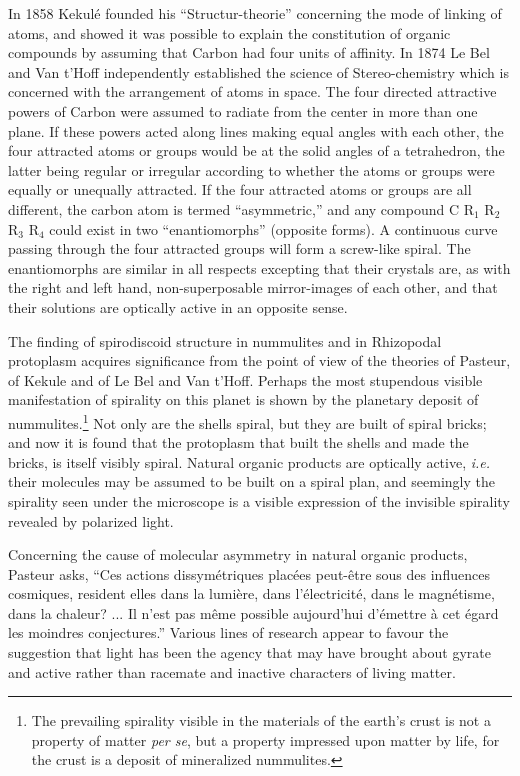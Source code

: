 \documentclass[a4paper, 12pt, oneside, landscape]{article}
\begin{document}
In 1858 Kekulé founded his ``Structur-theorie'' concerning the mode of linking of atoms, and showed it was possible to explain the constitution of organic compounds by assuming that Carbon had four units of affinity. In 1874 Le Bel and Van t'Hoff independently established the science of Stereo-chemistry which is concerned with the arrangement of atoms in space. The four directed attractive powers of Carbon were assumed to radiate from the center in more than one plane. If these powers acted along lines making equal angles with each other, the four attracted atoms or groups would be at the solid angles of a tetrahedron, the latter being regular or irregular according to whether the atoms or groups were equally or unequally attracted. If the four attracted atoms or groups are all different, the carbon atom is termed ``asymmetric,'' and any compound C R$_{1}$ R$_{2}$ R$_{3}$ R$_{4}$ could exist in two ``enantiomorphs'' (opposite forms). A continuous curve passing through the four attracted groups will form a screw-like spiral. The enantiomorphs are similar in all respects excepting that their crystals are, as with the right and left hand, non-superposable mirror-images of each other, and that their solutions are optically active in an opposite sense.

The finding of spirodiscoid structure in nummulites and in Rhizopodal protoplasm acquires significance from the point of view of the theories of Pasteur, of Kekule and of Le Bel and Van t'Hoff. Perhaps the most stupendous visible manifestation of spirality on this planet is shown by the planetary deposit of nummulites.\footnote{The prevailing spirality visible in the materials of the earth's crust is not a property of matter \emph{per se}, but a property impressed upon matter by life, for the crust is a deposit of mineralized nummulites.} Not only are the shells spiral, but they are built of spiral bricks; and now it is found that the protoplasm that built the shells and made the bricks, is itself visibly spiral. Natural organic products are optically active, \emph{i.e.} their molecules may be assumed to be built on a spiral plan, and seemingly the spirality seen under the microscope is a visible expression of the invisible spirality revealed by polarized light.

Concerning the cause of molecular asymmetry in natural organic products, Pasteur asks, ``Ces actions dissymétriques placées peut-être sous des influences cosmiques, resident elles dans la lumière, dans l'électricité, dans le magnétisme, dans la chaleur? ... Il n'est pas même possible aujourd'hui d'émettre à cet égard les moindres conjectures.'' Various lines of research appear to favour the suggestion that light has been the agency that may have brought about gyrate and active rather than racemate and inactive characters of living matter.
\end{document}
